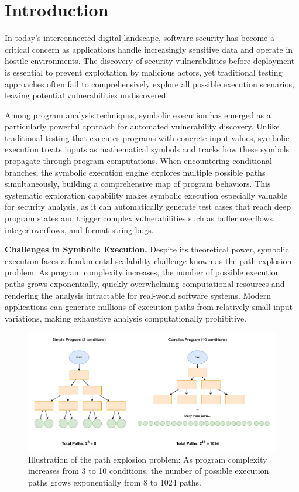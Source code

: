 \chapter{Introduction}

In today's interconnected digital landscape, software security has become a critical concern as applications handle increasingly sensitive data and operate in hostile environments.
The discovery of security vulnerabilities before deployment is essential to prevent exploitation by malicious actors, yet traditional testing approaches often fail to comprehensively explore all possible execution scenarios, leaving potential vulnerabilities undiscovered.

Among program analysis techniques, symbolic execution has emerged as a particularly powerful approach for automated vulnerability discovery.
Unlike traditional testing that executes programs with concrete input values, symbolic execution treats inputs as mathematical symbols and tracks how these symbols propagate through program computations.
When encountering conditional branches, the symbolic execution engine explores multiple possible paths simultaneously, building a comprehensive map of program behaviors.
This systematic exploration capability makes symbolic execution especially valuable for security analysis, as it can automatically generate test cases that reach deep program states and trigger complex vulnerabilities such as buffer overflows, integer overflows, and format string bugs.

\textbf{Challenges in Symbolic Execution.} Despite its theoretical power, symbolic execution faces a fundamental scalability challenge known as the path explosion problem.
As program complexity increases, the number of possible execution paths grows exponentially, quickly overwhelming computational resources and rendering the analysis intractable for real-world software systems.
Modern applications can generate millions of execution paths from relatively small input variations, making exhaustive analysis computationally prohibitive.
\begin{figure}[htbp]
    \centering
    \includegraphics[width=\textwidth]{Figures/path_explosion_problem}
    \caption{Illustration of the path explosion problem: As program complexity increases from 3 to 10 conditions, the number of possible execution paths grows exponentially from 8 to 1024 paths.}
    \label{fig:path_explosion_problem}
\end{figure}

